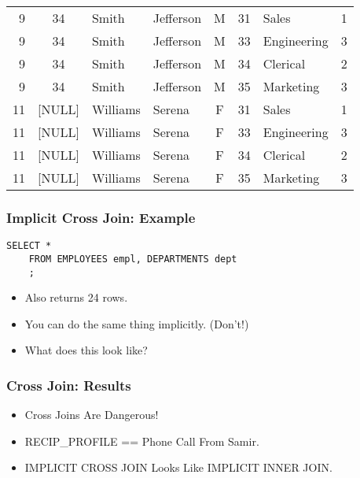 \documentclass{beamer}
\begin{document}
\begin{frame}
\begin{center}
{\begin{tabulary}{\textwidth}{RCLLCRLC}
        9   & 34       & Smith      & Jefferson   & M      & 31       & Sales       & 1           \\
        9   & 34       & Smith      & Jefferson   & M      & 33       & Engineering & 3           \\
        9   & 34       & Smith      & Jefferson   & M      & 34       & Clerical    & 2           \\
        9   & 34       & Smith      & Jefferson   & M      & 35       & Marketing   & 3           \\
        11  & [NULL]   & Williams   & Serena      & F      & 31       & Sales       & 1           \\
        11  & [NULL]   & Williams   & Serena      & F      & 33       & Engineering & 3           \\
        11  & [NULL]   & Williams   & Serena      & F      & 34       & Clerical    & 2           \\
        11  & [NULL]   & Williams   & Serena      & F      & 35       & Marketing   & 3           \\
      \end{tabulary}
    }
  \end{center}

\end{frame}

\begin{frame}[containsverbatim]
  \frametitle{Implicit Cross Join: Example}
 
  \begin{lstlisting}[title={\tiny Source: https://github.com/Choens/sql-survival-guide/blob/master/sql/04-joins/cross-joins.sql}]
    SELECT *
    FROM EMPLOYEES empl, DEPARTMENTS dept
    ;
  \end{lstlisting}
  \bigskip
  \begin{itemize}
  \item Also returns 24 rows.
  \item You can do the same thing implicitly. (Don't!)
  \item What does this look like?
  \end{itemize}
  
\end{frame}

\begin{frame}
  \frametitle{Cross Join: Results}
  \begin{itemize}
  \item Cross Joins Are Dangerous!
  \item RECIP\_PROFILE == Phone Call From Samir.
  \item IMPLICIT CROSS JOIN Looks Like IMPLICIT INNER JOIN.
  \end{itemize}
\end{frame}
\end{document}
